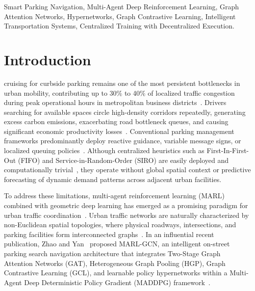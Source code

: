 \documentclass[journal]{IEEEtran}
\begin{document}
\begin{abstract}
joint 9-agent policy forward pass of $158.52 \pm 5.76~\mu$s, verifying real-time embedded viability. Finally, we document the software adaptation connecting this municipal research architecture to an operational 5-stall IoT campus deployment governed by safety conditional booking safeguards.
\end{abstract}

\begin{IEEEkeywords}
Smart Parking Navigation, Multi-Agent Deep Reinforcement Learning, Graph Attention Networks, Hypernetworks, Graph Contrastive Learning, Intelligent Transportation Systems, Centralized Training with Decentralized Execution.
\end{IEEEkeywords}

\section{Introduction}
 cruising for curbside parking remains one of the most persistent bottlenecks in urban mobility, contributing up to 30\% to 40\% of localized traffic congestion during peak operational hours in metropolitan business districts~\cite{shoup2005high,arnott2006economic}. Drivers searching for available spaces circle high-density corridors repeatedly, generating excess carbon emissions, exacerbating road bottleneck queues, and causing significant economic productivity losses~\cite{lin2017survey}. Conventional parking management frameworks predominantly deploy reactive guidance, variable message signs, or localized queuing policies~\cite{vlahogianni2014real,zheng2015parking,geng2013new}. Although centralized heuristics such as First-In-First-Out (FIFO) and Service-in-Random-Order (SIRO) are easily deployed and computationally trivial~\cite{larson2007urban,sandholm2010prediction}, they operate without global spatial context or predictive forecasting of dynamic demand patterns across adjacent urban facilities.

To address these limitations, multi-agent reinforcement learning (MARL) combined with geometric deep learning has emerged as a promising paradigm for urban traffic coordination~\cite{wang2022deep,zhang2021multi}. Urban traffic networks are naturally characterized by non-Euclidean spatial topologies, where physical roadways, intersections, and parking facilities form interconnected graphs~\cite{kipf2017semi,velickovic2018graph,li2018diffusion,yu2018spatio}. In an influential recent publication, Zhao and Yan~\cite{zhao2025deep} proposed MARL-GCN, an intelligent on-street parking search navigation architecture that integrates Two-Stage Graph Attention Networks (GAT), Heterogeneous Graph Pooling (HGP), Graph Contrastive Learning (GCL), and learnable policy hypernetworks within a Multi-Agent Deep Deterministic Policy Gradient (MADDPG) framework~\cite{lowe2017multi}. 
\end{document}
